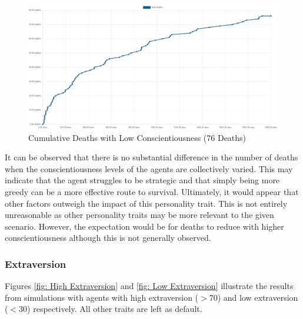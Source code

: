 \begin{figure}[H]
    \begin{center}
        \includegraphics[scale=0.25]{Images/Cumulative Deaths, With Treaties, T7Only, 2000days, 20food, Low Conscient, 76deaths.png}
    \end{center}
    \caption{Cumulative Deaths with Low Conscientiousness (76 Deaths)}
    \label{fig: Low Conscientiousness}
\end{figure}

It can be observed that there is no substantial difference in the number of deaths when the conscientiousness levels of the agents are collectively varied. This may indicate that the agent struggles to be strategic and that simply being more greedy can be a more effective route to survival. Ultimately, it would appear that other factors outweigh the impact of this personality trait. This is not entirely unreasonable as other personality traits may be more relevant to the given scenario. However, the expectation would be for deaths to reduce with higher conscientiousness although this is not generally observed. 

\newpage
\subsubsection{Extraversion}
\label{subsubsec: Extraversion}

Figures \ref{fig: High Extraversion} and \ref{fig: Low Extraversion} illustrate the results from simulations with agents with high extraversion ($>$70) and low extraversion ($<$30) respectively. All other traits are left as default.

